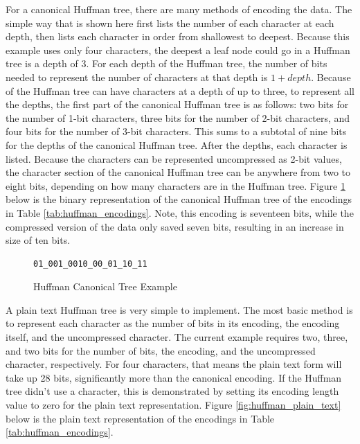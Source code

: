 \documentclass[doublespace,nopageskip]{VTthesis}
\begin{document}
For a canonical Huffman tree, there are many methods of encoding the data. The simple way that is shown here first lists the number of each character at each depth, then lists each character in order from shallowest to deepest. Because this example uses only four characters, the deepest a leaf node could go in a Huffman tree is a depth of 3. For each depth of the Huffman tree, the number of bits needed to represent the number of characters at that depth is $1+depth$. Because of the Huffman tree can have characters at a depth of up to three, to represent all the depths, the first part of the canonical Huffman tree is as follows: two bits for the number of 1-bit characters, three bits for the number of 2-bit characters, and four bits for the number of 3-bit characters. This sums to a subtotal of nine bits for the depths of the canonical Huffman tree. After the depths, each character is listed. Because the characters can be represented uncompressed as 2-bit values, the character section of the canonical Huffman tree can be anywhere from two to eight bits, depending  on how many characters are in the Huffman tree. Figure \ref{fig:huffman_canonical} below is the binary representation of the canonical Huffman tree of the encodings in Table \ref{tab:huffman_encodings}. Note, this encoding is seventeen bits, while the compressed version of the data only saved seven bits, resulting in an increase in size of ten bits.

\begin{figure}[htb]
	\centering
    \begin{lstlisting}
01_001_0010_00_01_10_11
    \end{lstlisting}
	\caption{Huffman Canonical Tree Example}
	\label{fig:huffman_canonical}
\end{figure}

A plain text Huffman tree is very simple to implement. The most basic method is to represent each character as the number of bits in its encoding, the encoding itself, and the uncompressed character. The current example requires two, three, and two bits for the number of bits, the encoding, and the uncompressed character, respectively. For four characters, that means the plain text form will take up 28 bits, significantly more than the canonical encoding. If the Huffman tree didn't use a character, this is demonstrated by setting its encoding length value to zero for the plain text representation. Figure \ref{fig:huffman_plain_text} below is the plain text representation of the encodings in Table \ref{tab:huffman_encodings}.
\end{document}
